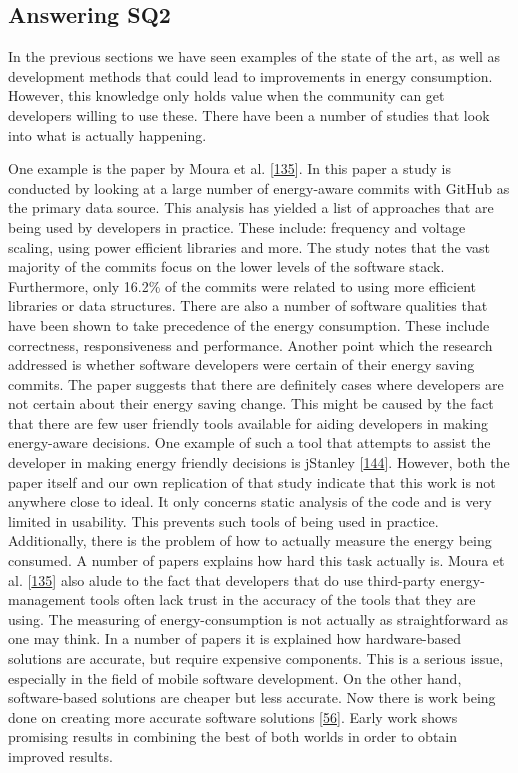 \documentclass[]{book}
\begin{document}
\subsection{Answering SQ2}\label{answering-sq2}

In the previous sections we have seen examples of the state of the art,
as well as development methods that could lead to improvements in energy
consumption. However, this knowledge only holds value when the community
can get developers willing to use these. There have been a number of
studies that look into what is actually happening.

One example is the paper by Moura et al.
{[}\protect\hyperlink{ref-MPEC2015}{135}{]}. In this paper a study is
conducted by looking at a large number of energy-aware commits with
GitHub as the primary data source. This analysis has yielded a list of
approaches that are being used by developers in practice. These include:
frequency and voltage scaling, using power efficient libraries and more.
The study notes that the vast majority of the commits focus on the lower
levels of the software stack. Furthermore, only 16.2\% of the commits
were related to using more efficient libraries or data structures. There
are also a number of software qualities that have been shown to take
precedence of the energy consumption. These include correctness,
responsiveness and performance. Another point which the research
addressed is whether software developers were certain of their energy
saving commits. The paper suggests that there are definitely cases where
developers are not certain about their energy saving change. This might
be caused by the fact that there are few user friendly tools available
for aiding developers in making energy-aware decisions. One example of
such a tool that attempts to assist the developer in making energy
friendly decisions is jStanley
{[}\protect\hyperlink{ref-PSCS2018}{144}{]}. However, both the paper
itself and our own replication of that study indicate that this work is
not anywhere close to ideal. It only concerns static analysis of the
code and is very limited in usability. This prevents such tools of being
used in practice. Additionally, there is the problem of how to actually
measure the energy being consumed. A number of papers explains how hard
this task actually is. Moura et al.
{[}\protect\hyperlink{ref-MPEC2015}{135}{]} also alude to the fact that
developers that do use third-party energy-management tools often lack
trust in the accuracy of the tools that they are using. The measuring of
energy-consumption is not actually as straightforward as one may think.
In a number of papers it is explained how hardware-based solutions are
accurate, but require expensive components. This is a serious issue,
especially in the field of mobile software development. On the other
hand, software-based solutions are cheaper but less accurate. Now there
is work being done on creating more accurate software solutions
{[}\protect\hyperlink{ref-NPPPZL2017}{56}{]}. Early work shows promising
results in combining the best of both worlds in order to obtain improved
results.
\end{document}
